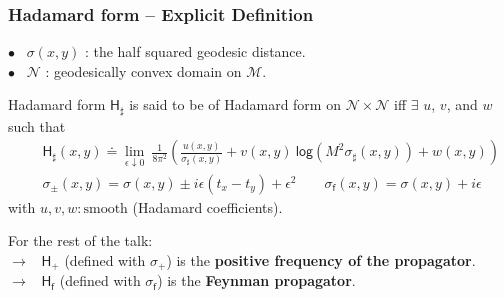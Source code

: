 \documentclass[9pt]{beamer}
\renewcommand{\log}{\mathsf{log}} %
\newcommand{\Mcal}{\mathcal{M}}
\newcommand{\Ncal}{\mathcal{N}}
\newcommand{\Hsf}{\mathsf{H}}
\newcommand{\fsf}{\mathsf{f}}
\begin{document}
\begin{frame}

\frametitle{Hadamard form -- Explicit Definition}

\vfill

$\bullet$ \ $\sigma(x,y)$ : the half squared geodesic distance. \\[2pt]

$\bullet$ \ $\Ncal$ : geodesically convex domain on $\Mcal$.

\vfill

\begin{block}{Hadamard form}
$\Hsf_\sharp$ is said to be of Hadamard form on $\Ncal \times \Ncal$ iff $\exists$ $u$, $v$, and $w$ such that
\begin{eqnarray*}
&& \Hsf_\sharp(x,y) \doteq \lim_{\epsilon \downarrow 0} \ \frac{1}{8\pi^2}\left(\frac{u(x,y)}{\sigma_\sharp(x,y)}+v(x,y) \ \log(M^2 \sigma_\sharp(x,y))+w(x,y)\right)  \\[4pt]
&& \sigma_\pm(x,y) = \sigma(x,y) \pm i\epsilon(t_x-t_y) + \epsilon^2 \qquad \sigma_\fsf(x,y) = \sigma(x,y) + i\epsilon 
\end{eqnarray*}
with $u,v,w:  \mbox{smooth}$ (Hadamard coefficients).
\end{block}

For the rest of the talk: \\[2pt]
\qquad $\to$ \ $\Hsf_+$ (defined with $\sigma_+$) is the \textbf{positive frequency of the propagator}. \\
\qquad $\to$ \ $\Hsf_\fsf$ (defined with $\sigma_\fsf$) is the \textbf{Feynman propagator}.

\end{frame} 

\end{document}
